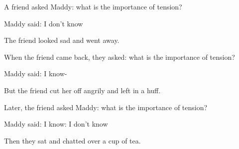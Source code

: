 A friend asked Maddy: what is the importance of tension?

Maddy said: I don't know

The friend looked sad and went away.

When the friend came back, they asked: what is the importance of tension?

Maddy said: I know-

But the friend cut her off angrily and left in a huff.

Later, the friend asked Maddy: what is the importance of tension?

Maddy said: I know: I don't know

Then they sat and chatted over a cup of tea.
